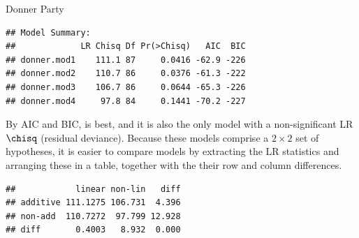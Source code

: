 \documentclass[11pt]{book}
\renewenvironment{knitrout}{\small\renewcommand{\baselinestretch}{.85}}{} %
\begin{document}
\begin{Example}[donner1]{Donner Party}
\begin{knitrout}
\color{fgcolor}\begin{kframe}
\begin{alltt}
 \hlkwb{<-} 
\end{alltt}
\begin{verbatim}
## Model Summary:
##             LR Chisq Df Pr(>Chisq)   AIC  BIC
## donner.mod1    111.1 87     0.0416 -62.9 -226
## donner.mod2    110.7 86     0.0376 -61.3 -222
## donner.mod3    106.7 86     0.0644 -65.3 -226
## donner.mod4     97.8 84     0.1441 -70.2 -227
\end{verbatim}
\end{kframe}
\end{knitrout}

By AIC and BIC,  is best, and it is also the
only model with a non-significant LR $\chisq$ (residual deviance). Because these
models comprise a $2 \times 2$ set of hypotheses, it is easier to
compare models by extracting the LR statistics and arranging these
in a table, together with the their row and column differences.
\begin{knitrout}
\color{fgcolor}\begin{kframe}
\begin{alltt}
 \hlkwb{<-}  \hlstd{(}\hlopt{$}
 \hlkwb{<-}  \hlstd{,} \hlstd{)}
 \hlkwb{<-} \hlstd{(}\hlstd{,} \hlstd{)}
 \hlkwb{<-} \hlstd{(}\hlstd{,} \hlstd{)}
\hlkwb{<-}  \hlstd{= LR[,}\hlstd{]}\hlopt{-}\hlstd{LR[,}\hlstd{])}
 \hlkwb{<-}  \hlstd{=} \hlstd{(LR[}\hlstd{,}\hlopt{:}\hlstd{]}\hlopt{-}\hlstd{LR[}\hlstd{,}\hlopt{:}\hlstd{],}\hlstd{))}
\end{alltt}
\begin{verbatim}
##            linear non-lin   diff
## additive 111.1275 106.731  4.396
## non-add  110.7272  97.799 12.928
## diff       0.4003   8.932  0.000
\end{verbatim}
\end{kframe}
\end{knitrout}


\end{Example}
\end{document}
